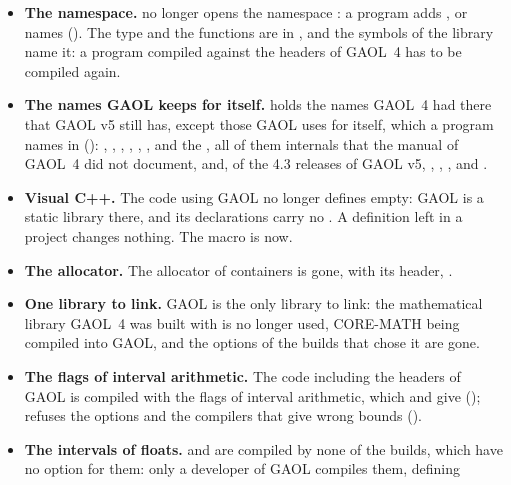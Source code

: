 \documentclass[12pt,a4paper,twoside,openright]{book}
\begin{document}
\begin{itemize}
\item[$\bullet$] \textbf{The namespace.}  no longer opens
  the namespace : a program adds , or
  names  (). The type and the
  functions are in , and the symbols of the library name it:
  a program compiled against the headers of GAOL~4 has to be compiled again.
\item[$\bullet$] \textbf{The names GAOL keeps for itself.}  holds
  the names GAOL~4 had there that GAOL v5 still has, except those GAOL uses
  for itself, which a program names in 
  (): , ,
  , , ,
  ,  and the , all of
  them internals that the manual of GAOL~4 did not document, and, of the 4.3
  releases of GAOL v5,
  , , ,
   and .
\item[$\bullet$] \textbf{Visual C++.} The code using GAOL no longer defines
   empty: GAOL is a static library there, and its
  declarations carry no . A definition left in
  a project changes nothing. The macro is  now.
\item[$\bullet$] \textbf{The allocator.} The allocator of containers
   is gone, with its header,
  .
\item[$\bullet$] \textbf{One library to link.} GAOL is the only library to
  link: the mathematical library GAOL~4 was built with is no longer used,
  CORE-MATH being compiled into GAOL, and the options of the builds that chose
  it are gone.
\item[$\bullet$] \textbf{The flags of interval arithmetic.} The code
  including the headers of GAOL is compiled with the flags of interval
  arithmetic, which  and  give
  ();  refuses the options and
  the compilers that give wrong bounds ().
\item[$\bullet$] \textbf{The intervals of floats.}  and
   are compiled by none of the builds, which have no
  option for them: only a developer of GAOL compiles them, defining

\end{itemize}
\end{document}
